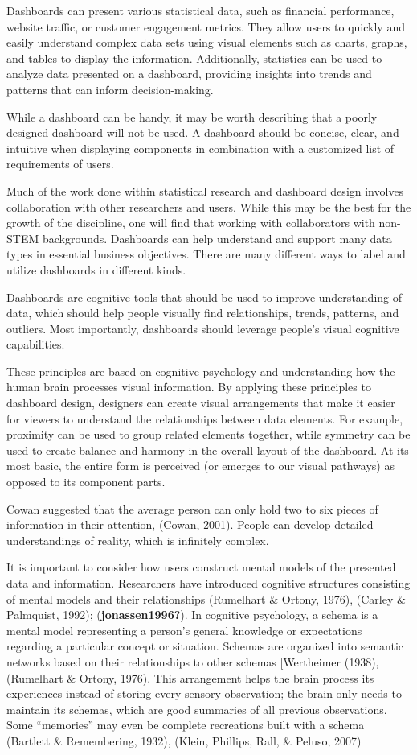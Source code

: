 \documentclass[print]{nuthesis}
\begin{document}
Dashboards can present various statistical data, such as financial performance, website traffic, or customer engagement metrics.
They allow users to quickly and easily understand complex data sets using visual elements such as charts, graphs, and tables to display the information.
Additionally, statistics can be used to analyze data presented on a dashboard, providing insights into trends and patterns that can inform decision-making.

While a dashboard can be handy, it may be worth describing that a poorly designed dashboard will not be used.
A dashboard should be concise, clear, and intuitive when displaying components in combination with a customized list of requirements of users.

Much of the work done within statistical research and dashboard design involves collaboration with other researchers and users.
While this may be the best for the growth of the discipline, one will find that working with collaborators with non-STEM backgrounds.
Dashboards can help understand and support many data types in essential business objectives.
There are many different ways to label and utilize dashboards in different kinds.

Dashboards are cognitive tools that should be used to improve understanding of data, which should help people visually find relationships, trends, patterns, and outliers.
Most importantly, dashboards should leverage people's visual cognitive capabilities.

These principles are based on cognitive psychology and understanding how the human brain processes visual information.
By applying these principles to dashboard design, designers can create visual arrangements that make it easier for viewers to understand the relationships between data elements.
For example, proximity can be used to group related elements together, while symmetry can be used to create balance and harmony in the overall layout of the dashboard.
At its most basic, the entire form is perceived (or emerges to our visual pathways) as opposed to its component parts.

Cowan suggested that the average person can only hold two to six pieces of information in their attention, (Cowan, 2001).
People can develop detailed understandings of reality, which is infinitely complex.

It is important to consider how users construct mental models of the presented data and information.
Researchers have introduced cognitive structures consisting of mental models and their relationships (Rumelhart \& Ortony, 1976), (Carley \& Palmquist, 1992); (\textbf{jonassen1996?}).
In cognitive psychology, a schema is a mental model representing a person's general knowledge or expectations regarding a particular concept or situation.
Schemas are organized into semantic networks based on their relationships to other schemas {[}Wertheimer (1938),(Rumelhart \& Ortony, 1976).
This arrangement helps the brain process its experiences instead of storing every sensory observation; the brain only needs to maintain its schemas, which are good summaries of all previous observations.
Some ``memories'' may even be complete recreations built with a schema (Bartlett \& Remembering, 1932), (Klein, Phillips, Rall, \& Peluso, 2007)
\end{document}
